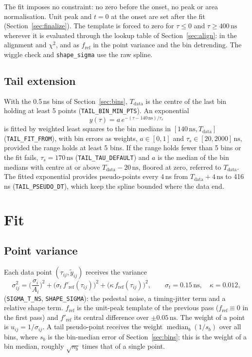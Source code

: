 \documentclass[11pt]{article}
\newcommand{\ns}{\,\mathrm{ns}}
\newcommand{\code}[1]{\texttt{#1}}
\DeclareMathOperator{\median}{median}
\begin{document}
The fit imposes no constraint: no zero before the onset, no peak or area normalisation. Unit peak and $t = 0$ at the onset are set after the fit (Section~\ref{sec:finalize}). The template is forced to zero for $\tau \le 0$ and $\tau \ge 400\ns$ wherever it is evaluated through the lookup table of Section~\ref{sec:align}: in the alignment and $\chi^2$, and as $f_{\mathrm{ref}}$ in the point variance and the bin detrending. The wiggle check and \code{shape\_sigma} use the raw spline.

\subsection{Tail extension}
\label{sec:tail}

With the 0.5\,ns bins of Section~\ref{sec:bins}, $T_{\mathrm{data}}$ is the centre of the last bin holding at least 5 points (\code{TAIL\_BIN\_MIN\_PTS}). An exponential
\begin{equation}
y(\tau) = a\, e^{-(\tau - 140\ns)/\tau_s}
\end{equation}
is fitted by weighted least squares to the bin medians in $[140\ns, T_{\mathrm{data}}]$ (\code{TAIL\_FIT\_FROM}), with bin errors as weights, $a \in [0, 1]$ and $\tau_s \in [20, 2000]\ns$, provided the range holds at least 5 bins. If the range holds fewer than 5 bins or the fit fails, $\tau_s = 170\ns$ (\code{TAIL\_TAU\_DEFAULT}) and $a$ is the median of the bin medians with centre at or above $T_{\mathrm{data}} - 20\ns$, floored at zero, referred to $T_{\mathrm{data}}$. The fitted exponential provides pseudo-points every 4\,ns from $T_{\mathrm{data}} + 4\ns$ to 416\,ns (\code{TAIL\_PSEUDO\_DT}), which keep the spline bounded where the data end.

\section{Fit}
\label{sec:fit}

\subsection{Point variance}

Each data point $(\tau_{ij}, \tilde y_{ij})$ receives the variance
\begin{equation}
\sigma^2_{ij} = \Big(\frac{\sigma_i}{A_i}\Big)^2 + \big(\sigma_t\, f'_{\mathrm{ref}}(\tau_{ij})\big)^2 + \big(\kappa\, f_{\mathrm{ref}}(\tau_{ij})\big)^2,
\qquad \sigma_t = 0.15\ns,\quad \kappa = 0.012,
\label{eq:var}
\end{equation}
(\code{SIGMA\_T\_NS}, \code{SHAPE\_SIGMA}): the pedestal noise, a timing-jitter term and a relative shape term. $f_{\mathrm{ref}}$ is the unit-peak template of the previous pass ($f_{\mathrm{ref}} \equiv 0$ in the first pass) and $f'_{\mathrm{ref}}$ its central difference over $\pm 0.05\ns$. The weight of a point is $u_{ij} = 1/\sigma_{ij}$. A tail pseudo-point receives the weight $\median_b (1/s_b)$ over all bins, where $s_b$ is the bin-median error of Section~\ref{sec:bins}; this is the weight of a bin median, roughly $\sqrt{n_b}$ times that of a single point.
\end{document}
